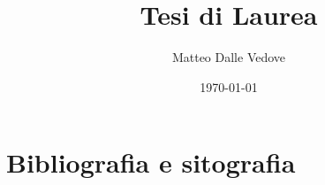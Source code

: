 \documentclass[10pt,a4paper]{article}
\title{Tesi di Laurea}
\author{Matteo Dalle Vedove}
\date{\today}
\begin{document}
	
	\maketitle
	
	\tableofcontents
	
	\newpage
	
	
	\newpage
	
	
	\newpage
	\section{Bibliografia e sitografia}
	\printbibliography[heading=none]
		
\end{document}
